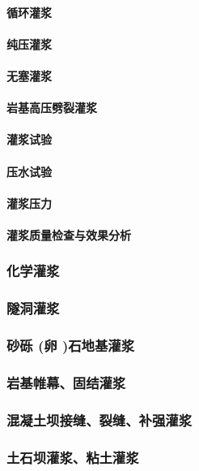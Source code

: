 \documentclass[UTF8]{../../ApplicationUniverse}
\begin{document}
            \paragraph{循环灌浆}
            \paragraph{纯压灌浆}
            \paragraph{无塞灌浆}
            \paragraph{岩基高压劈裂灌浆}
            \paragraph{灌浆试验}
            \paragraph{压水试验}
            \paragraph{灌浆压力}
            \paragraph{灌浆质量检查与效果分析}
        \subsubsection{化学灌浆}
        \subsubsection{隧洞灌浆}
        \subsubsection{砂砾 (卵 )石地基灌浆}
        \subsubsection{岩基帷幕、固结灌浆}
        \subsubsection{混凝土坝接缝、裂缝、补强灌浆}
        \subsubsection{土石坝灌浆、粘土灌浆}
\end{document}
